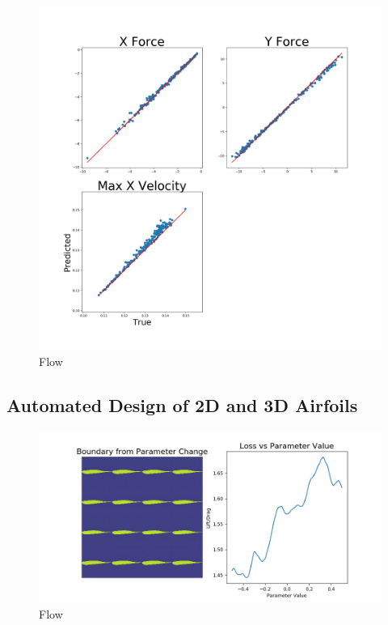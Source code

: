 \documentclass{article} %
\begin{document}
\begin{figure}[h]
\begin{center}
\includegraphics[scale=0.34]{../test/figs/flow_accuracy_2d.jpeg}
\end{center}
\caption{Flow}
\end{figure}

\subsection{Automated Design of 2D and 3D Airfoils}

\begin{figure}[h]
\begin{center}
\includegraphics[scale=0.34]{../test/figs/boundary_space_explore.jpeg}
\end{center}
\caption{Flow}
\end{figure}
\end{document}
